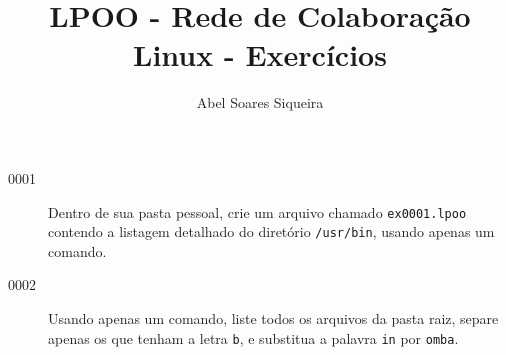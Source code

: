 \documentclass[letterpaper,11pt]{article}
\title{ LPOO - Rede de Colaboração \\
Linux - Exercícios }
\author{ Abel Soares Siqueira }
\begin{document}
\maketitle

\begin{description}
  \item[0001] Dentro de sua pasta pessoal, crie um arquivo chamado 
    \verb+ex0001.lpoo+ contendo a listagem detalhado do diretório 
    \verb+/usr/bin+, usando apenas um comando. \easy
  \item[0002] Usando apenas um comando, liste todos os arquivos da pasta
    raiz, separe apenas os que tenham a letra \verb+b+, e substitua
    a palavra \verb+in+ por \verb+omba+. \hard
\end{description}
\end{document}
